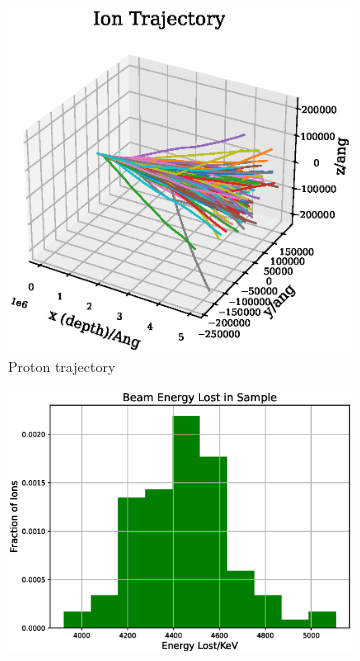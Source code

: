 \begin{figure}[htb]
\centering
\begin{subfigure}{0.49\textwidth}
  \includegraphics[width=\linewidth]{chapters/activity_code/images/trajectory_3d_500um.eps}
  \caption{Proton trajectory}
  \label{fig:iontrajectory1}
\end{subfigure}\hfil
\begin{subfigure}{0.49\textwidth}
  \includegraphics[width=\linewidth]{chapters/activity_code/images/energy_lost_500um.eps}

\end{subfigure}
\end{figure}
